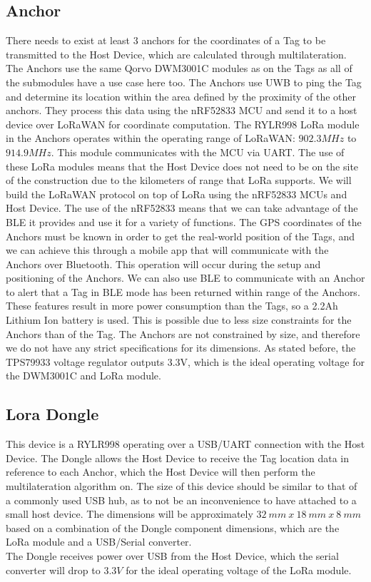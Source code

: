 \documentclass[conference]{IEEEtran}
\begin{document}
\subsection{Anchor}
There needs to exist at least $3$ anchors for the coordinates of a Tag to be 
transmitted to the Host Device, which are calculated through multilateration. 
The Anchors use the same Qorvo DWM3001C modules as on the Tags as all 
of the submodules have a use case here too. The Anchors use UWB to ping 
the Tag and determine its location within the area defined by the 
proximity of the other anchors. They process this data using the 
nRF52833 MCU and send it to a host device over LoRaWAN for coordinate computation. 
The RYLR998 LoRa module in the Anchors operates within the operating range of 
LoRaWAN: $902.3 MHz$ to $914.9 MHz$. This module communicates with the MCU 
via UART. The use of these LoRa modules means that the Host Device does 
not need to be on the site of the construction due to the 
kilometers of range that LoRa supports. We will build the LoRaWAN 
protocol on top of LoRa using the nRF52833 MCUs and Host Device. The use of the nRF52833 
means that we can take advantage of the BLE it provides and use 
it for a variety of functions. The GPS coordinates of the Anchors must 
be known in order to get the real-world position of the Tags, and we can achieve
this through a mobile app that will communicate with the Anchors over Bluetooth. 
This operation will occur during the setup and positioning of the Anchors. We can also
use BLE to communicate with an Anchor to alert that a Tag in 
BLE mode has been returned within range of the Anchors. These features 
result in  more power consumption than the Tags, so a 2.2Ah Lithium Ion 
battery is used. This is possible due to less size constraints for the 
Anchors than of the Tag. The Anchors are not constrained by size, and therefore we 
do not have any strict specifications for its dimensions.
As stated before, the TPS79933 voltage regulator outputs 3.3V, which is 
the ideal operating voltage for the DWM3001C and LoRa module. 


\subsection{Lora Dongle}
This device is a RYLR998 operating over a USB/UART connection with the 
Host Device. The Dongle allows the Host Device to receive the Tag location data in 
reference to each Anchor, which the Host Device will then perform the multilateration algorithm on.
The size of this device should be similar 
to that of a commonly used USB hub, as to not be an inconvenience to have attached to a 
small host device. The dimensions will be approximately $32 \ mm\  x \ 18 \ mm \
x \ 8 \ mm$ based on a combination of the Dongle component dimensions, which are the LoRa 
module and a USB/Serial converter. 
\\ The Dongle receives power over USB from the Host Device, which the serial converter will
drop to $3.3V$ for the ideal operating voltage of the LoRa module.
\end{document}
